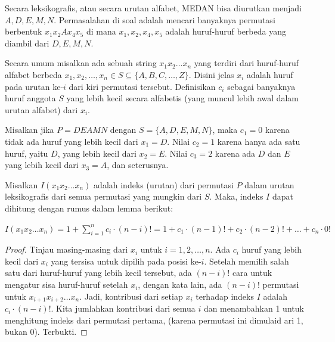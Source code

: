 
\begin{solusi}
    Secara leksikografis, atau secara urutan alfabet, MEDAN bisa diurutkan menjadi $A,D,E,M,N$.
    Permasalahan di soal adalah mencari banyaknya permutasi berbentuk $x_1x_2Ax_4x_5$ di mana $x_1,x_2,x_4,x_5$ adalah huruf-huruf berbeda yang diambil dari $D,E,M,N$. 
    
    Secara umum misalkan ada sebuah string $x_1x_2\ldots x_n$ yang terdiri dari huruf-huruf alfabet berbeda $x_1, x_2, \ldots, x_n \in S \subseteq \{A,B,C,\ldots,Z\}$.
    Disini jelas $x_i$ adalah huruf pada urutan ke-$i$ dari kiri permutasi tersebut.
    Definisikan $c_i$ sebagai banyaknya huruf anggota $S$ yang lebih kecil secara alfabetis (yang muncul lebih awal dalam urutan alfabet) dari $x_i$.

    Misalkan jika $P = DEAMN$ dengan $S = \{A,D,E,M,N\}$, 
    maka $c_1 = 0$ karena tidak ada huruf yang lebih kecil dari $x_1=D$. 
    Nilai $c_2 = 1$ karena hanya ada satu huruf, yaitu $D$, yang lebih kecil dari $x_2=E$.
    Nilai $c_3 = 2$ karena ada $D$ dan $E$ yang lebih kecil dari $x_3=A$, dan seterusnya.
    
    Misalkan $I(x_1x_2\ldots x_n)$ adalah indeks (urutan) dari permutasi $P$ dalam urutan leksikografis dari semua permutasi yang mungkin dari $S$. Maka, indeks $I$ dapat dihitung dengan rumus dalam lemma berikut:
    \begin{lemma*}
        $I(x_1x_2\ldots x_n) = 1 + \sum_{i=1}^{n} c_i \cdot (n-i)! = 1 + c_1 \cdot (n-1)! + c_2 \cdot (n-2)! + \ldots + c_n \cdot 0!$
        
        \begin{proof}
            Tinjau masing-masing dari $x_i$ untuk $i=1,2,\ldots,n$.
            Ada $c_i$ huruf yang lebih kecil dari $x_i$ yang tersisa untuk dipilih pada posisi ke-$i$.
            Setelah memilih salah satu dari huruf-huruf yang lebih kecil tersebut, ada $(n-i)!$ cara untuk mengatur sisa huruf-huruf setelah $x_i$, 
            dengan kata lain, ada $(n-i)!$ permutasi untuk $x_{i+1}x_{i+2}\ldots x_n$.
            Jadi, kontribusi dari setiap $x_i$ terhadap indeks $I$ adalah $c_i \cdot (n-i)!$.
            Kita jumlahkan kontribusi dari semua $i$ dan menambahkan 1 untuk menghitung indeks dari permutasi pertama, (karena permutasi ini dimulaid ari 1, bukan 0).
            Terbukti.
        \end{proof}
    \end{lemma*}


\end{solusi}
